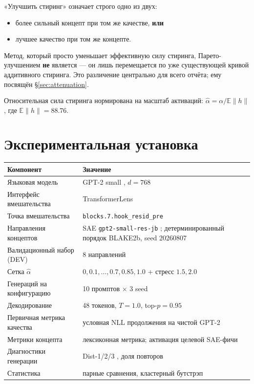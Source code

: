 \documentclass[10pt,a4paper]{article}
\newcommand{\ahat}{\hat{\alpha}}
\begin{document}
«Улучшить стиринг» означает строго одно из двух:
\begin{itemize}
  \item более сильный концепт при том же качестве, \textbf{или}
  \item лучшее качество при том же концепте.
\end{itemize}

Метод, который просто уменьшает эффективную силу стиринга, Парето-улучшением
\textbf{не} является — он лишь перемещается по уже существующей кривой аддитивного стиринга.
Это различение центрально для всего отчёта; ему посвящён \S\ref{sec:attenuation}.

Относительная сила стиринга нормирована на масштаб активаций:
$\ahat = \alpha / \mathbb{E}\lVert h \rVert$, где $\mathbb{E}\lVert h\rVert = 88.76$.

\section{Экспериментальная установка}

\begin{center}\small
\begin{tabular}{@{}p{5.2cm}p{9.6cm}@{}}
\toprule
Компонент & Значение\\
\midrule
Языковая модель & GPT-2 small \cite{radford2019gpt2}, $d = 768$\\
Интерфейс вмешательства & TransformerLens \cite{nanda2022transformerlens}\\
Точка вмешательства & \texttt{blocks.7.hook\_resid\_pre}\\
Направления концептов & SAE \texttt{gpt2-small-res-jb} \cite{bloom2024gpt2saes}; детерминированный порядок BLAKE2b, seed 20260807\\
Валидационный набор (DEV) & 8 направлений\\
Сетка $\ahat$ & $0, 0.1, \ldots, 0.7, 0.85, 1.0$ + стресс $1.5, 2.0$\\
Генераций на конфигурацию & 10 промптов $\times$ 3 seed\\
Декодирование & 48 токенов, $T=1.0$, top-$p = 0.95$ \cite{holtzman2020degeneration}\\
Первичная метрика качества & условная NLL продолжения на чистой GPT-2\\
Метрики концепта & лексиконная метрика; активация целевой SAE-фичи\\
Диагностики генерации & Dist-1/2/3 \cite{li2016diversity}, доля повторов\\
Статистика & парные сравнения, кластерный бутстрэп \cite{cameron2015clusterbootstrap}\\
\bottomrule
\end{tabular}
\end{center}
\end{document}
